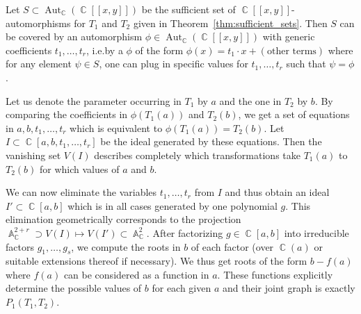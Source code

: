 \documentclass[noend]{amsproc}
\theoremstyle{definition}
\DeclareMathOperator{\C}{\mathbb{C}}
\DeclareMathOperator{\A}{\mathbb{A}}
\DeclareMathOperator{\Aut}{Aut}
\begin{document}
Let $S \subset \Aut_{\C}(\C[[x,y]])$ be the sufficient set of
$\C[[x,y]]$-automorphisms for $T_1$ and $T_2$ given in
Theorem~\ref{thm:sufficient_sets}. Then $S$ can be covered by an automorphism
$\phi \in \Aut_{\C}(\C[[x,y]])$ with generic coefficients $t_1, \ldots, t_r$,
i.e.\@ by a $\phi$ of the form $\phi(x) = t_1 \cdot x + (\text{other terms})$
where for any element $\psi \in S$, one can plug in specific values for
$t_1, \ldots, t_r$ such that $\psi = \phi$.

Let us denote the parameter occurring in $T_1$ by $a$ and the one in $T_2$ by
$b$. By comparing the coefficients in $\phi(T_1(a))$ and $T_2(b)$, we get a set
of equations in $a, b, t_1, \ldots, t_r$ which is equivalent to
$\phi(T_1(a)) = T_2(b)$. Let $I \subset \C[a,b,t_1,\ldots,t_r]$ be the ideal
generated by these equations. Then the vanishing set $V(I)$ describes
completely which transformations take $T_1(a)$ to $T_2(b)$ for which values of
$a$ and $b$.

We can now eliminate the variables $t_1, \ldots, t_r$ from $I$ and thus obtain
an ideal $I' \subset \C[a,b]$ which is in all cases generated by one polynomial
$g$. This elimination geometrically corresponds to the projection
$\A_{\C}^{2+r} \supset V(I) \mapsto V(I') \subset \A_{\C}^2$. After factorizing
$g \in \C[a,b]$ into irreducible factors $g_1, \ldots, g_s$, we compute the
roots in $b$ of each factor (over $\C(a)$ or suitable extensions thereof if
necessary). We thus get roots of the form $b-f(a)$ where $f(a)$ can be
considered as a function in $a$. These functions explicitly determine the
possible values of $b$ for each given $a$ and their joint graph is exactly
$P_1(T_1, T_2)$.
\end{document}
